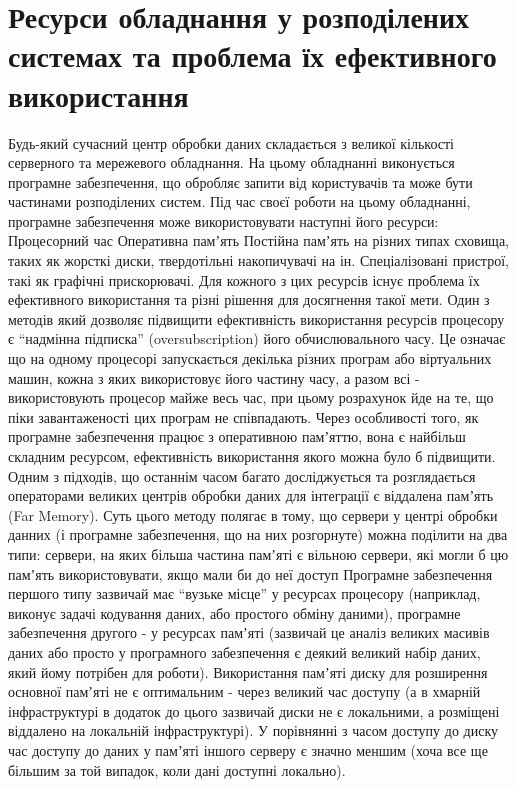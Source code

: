\documentclass[14pt]{article}
\begin{document}
\section{Ресурси обладнання у розподілених системах та проблема їх ефективного використання}
Будь-який сучасний центр обробки даних складається з великої кількості серверного та мережевого обладнання. На цьому обладнанні виконується програмне забезпечення, що обробляє запити від користувачів та може бути частинами розподілених систем.
	Під час своєї роботи на цьому обладнанні, програмне забезпечення може використовувати наступні його ресурси:
Процесорний час
Оперативна памʼять
Постійна памʼять на різних типах сховища, таких як жорсткі диски, твердотільні накопичувачі на ін.
Спеціалізовані пристрої, такі як графічні прискорювачі.
	Для кожного з цих ресурсів існує проблема їх ефективного використання та різні рішення для досягнення такої мети. 
	Один з методів який дозволяє підвищити ефективність використання ресурсів процесору є “надмінна підписка” (oversubscription) його обчислювального часу. Це означає що на одному процесорі запускається декілька різних програм або віртуальних машин, кожна з яких використовує його частину часу, а разом всі - використовують процесор майже весь час, при цьому розрахунок йде на те, що піки завантаженості цих програм не співпадають.
	Через особливості того, як програмне забезпечення працює з оперативною памʼяттю, вона є найбільш складним ресурсом, ефективність використання якого можна було б підвищити. Одним з підходів, що останнім часом багато досліджується та розглядається операторами великих центрів обробки даних для інтеграції є віддалена памʼять (Far Memory).
	Суть цього методу полягає в тому, що сервери у центрі обробки данних (і програмне забезпечення, що на них розгорнуте) можна поділити на два типи: 
сервери, на яких більша частина памʼяті є вільною
сервери, які могли б цю памʼять використовувати, якщо мали би до неї доступ
	Програмне забезпечення першого типу зазвичай має “вузьке місце” у ресурсах процесору (наприклад, виконує задачі кодування даних, або простого обміну даними), програмне забезпечення другого - у ресурсах памʼяті (зазвичай це аналіз великих масивів даних або просто у програмного забезпечення є деякий великий набір даних, який йому потрібен для роботи). Використання памʼяті диску для розширення основної памʼяті не є оптимальним - через великий час доступу (а в хмарній інфраструктурі в додаток до цього зазвичай диски не є локальними, а розміщені віддалено на локальній інфраструктурі). У порівнянні з часом доступу до диску час доступу до даних у памʼяті іншого серверу є значно меншим (хоча все ще більшим за той випадок, коли дані доступні локально).
\end{document}
